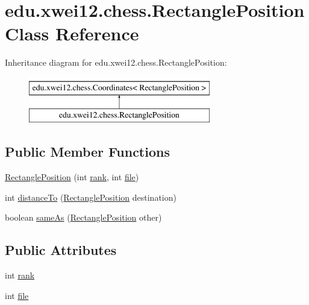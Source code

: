 \hypertarget{classedu_1_1xwei12_1_1chess_1_1_rectangle_position}{}\section{edu.\+xwei12.\+chess.\+Rectangle\+Position Class Reference}
\label{classedu_1_1xwei12_1_1chess_1_1_rectangle_position}
Inheritance diagram for edu.\+xwei12.\+chess.\+Rectangle\+Position\+:\begin{figure}[H]
\begin{center}
\leavevmode
\includegraphics[height=2.000000cm]{classedu_1_1xwei12_1_1chess_1_1_rectangle_position}
\end{center}
\end{figure}
\subsection*{Public Member Functions}
\begin{DoxyCompactItemize}
\item 
\hyperlink{classedu_1_1xwei12_1_1chess_1_1_rectangle_position_ab72fff693d3435a30423cd307860e44c}{Rectangle\+Position} (int \hyperlink{classedu_1_1xwei12_1_1chess_1_1_rectangle_position_a6dd9047eb4002335ba2ad44621ca3407}{rank}, int \hyperlink{classedu_1_1xwei12_1_1chess_1_1_rectangle_position_ac7e18a9bb18f8a1d2ef0b6591fa4bffd}{file})
\item 
int \hyperlink{classedu_1_1xwei12_1_1chess_1_1_rectangle_position_a32ae95db005f0f4776ec8cc9c474da25}{distance\+To} (\hyperlink{classedu_1_1xwei12_1_1chess_1_1_rectangle_position}{Rectangle\+Position} destination)
\item 
boolean \hyperlink{classedu_1_1xwei12_1_1chess_1_1_rectangle_position_a2f1d3536238edecb82e98b60f7d5b52e}{same\+As} (\hyperlink{classedu_1_1xwei12_1_1chess_1_1_rectangle_position}{Rectangle\+Position} other)
\end{DoxyCompactItemize}
\subsection*{Public Attributes}
\begin{DoxyCompactItemize}
\item 
int \hyperlink{classedu_1_1xwei12_1_1chess_1_1_rectangle_position_a6dd9047eb4002335ba2ad44621ca3407}{rank}
\item 
int \hyperlink{classedu_1_1xwei12_1_1chess_1_1_rectangle_position_ac7e18a9bb18f8a1d2ef0b6591fa4bffd}{file}
\end{DoxyCompactItemize}


